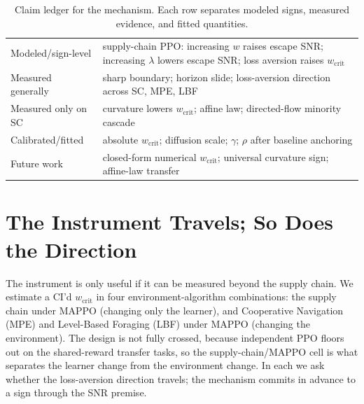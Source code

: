 \documentclass[letterpaper]{article} %
\theoremstyle{plain}
\newcommand{\wcrit}{w_{\mathrm{crit}}}
\begin{document}
\begin{table}[t]
\centering
\caption{Claim ledger for the mechanism. Each row separates modeled signs, measured evidence, and
fitted quantities.}
\label{tab:ledger}
{\setlength{\tabcolsep}{3pt}\small
\begin{tabular}{@{}p{}p{}@{}}
\toprule
Modeled/sign-level & supply-chain PPO: increasing $w$ raises escape SNR; increasing $\lambda$
lowers escape SNR; loss aversion raises $\wcrit$ \\
\addlinespace
Measured generally & sharp boundary; horizon slide; loss-aversion direction across SC, MPE, LBF \\
\addlinespace
Measured only on SC & curvature lowers $\wcrit$; affine law; directed-flow minority cascade \\
\addlinespace
Calibrated/fitted & absolute $\wcrit$; diffusion scale; $\gamma$; $\rho$ after baseline anchoring \\
\addlinespace
Future work & closed-form numerical $\wcrit$; universal curvature sign; affine-law transfer \\
\bottomrule
\end{tabular}}
\end{table}

\section{The Instrument Travels; So Does the Direction}
\label{sec:generalization}

The instrument is only useful if it can be measured beyond the supply chain. We estimate a CI'd
$\wcrit$ in four environment-algorithm combinations: the supply chain under MAPPO (changing only the
learner), and Cooperative Navigation (MPE) and Level-Based Foraging (LBF) under MAPPO (changing the
environment). The design is not fully crossed, because independent PPO floors out on the
shared-reward transfer tasks, so the supply-chain/MAPPO cell is what separates the learner change
from the environment change. In each we ask whether the loss-aversion direction travels; the
mechanism commits in advance to a sign through the SNR premise.
\end{document}

